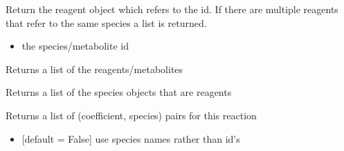 \documentclass[letterpaper,10pt,english]{sphinxmanual}
\begin{document}
\begin{fulllineitems}
\begin{fulllineitems}
\label{\detokenize{modules_doc:cbmpy.CBModel.Reaction.getReagentWithSpeciesRef}}
\pysigstartsignatures
{}
\pysigstopsignatures
\sphinxAtStartPar
Return the reagent object which refers to the  id. If there are multiple reagents that
refer to the same species a list is returned.
\begin{itemize}
\item {} 
\sphinxAtStartPar
{} the species/metabolite id

\end{itemize}

\end{fulllineitems}


\begin{fulllineitems}
\label{\detokenize{modules_doc:cbmpy.CBModel.Reaction.getSpeciesIds}}
\pysigstartsignatures
{}
\pysigstopsignatures
\sphinxAtStartPar
Returns a list of the reagents/metabolites

\end{fulllineitems}


\begin{fulllineitems}
\label{\detokenize{modules_doc:cbmpy.CBModel.Reaction.getSpeciesObj}}
\pysigstartsignatures
{}
\pysigstopsignatures
\sphinxAtStartPar
Returns a list of the species objects that are reagents

\end{fulllineitems}


\begin{fulllineitems}
\label{\detokenize{modules_doc:cbmpy.CBModel.Reaction.getStoichiometry}}
\pysigstartsignatures
{}
\pysigstopsignatures
\sphinxAtStartPar
Returns a list of (coefficient, species) pairs for this reaction
\begin{itemize}
\item {} 
\sphinxAtStartPar
{} {[}default = False{]} use species names rather than id’s


\end{itemize}
\end{fulllineitems}
\end{fulllineitems}
\end{document}
